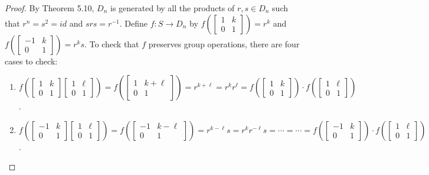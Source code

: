 \documentclass{article}
\theoremstyle{definition}
\newcommand{\inv}[1]{#1^{-1}}
\begin{document}
\begin{proof}
		By Theorem 5.10, $D_n$ is generated by all the products of $r,s\in D_n$ such that $r^n = s^2 = id$ and $srs = \inv{r}$. Define $f: S\to D_n$ by $f\left( \left[ \begin{smallmatrix} 1&k\\0&1\end{smallmatrix} \right] \right) = r^k$ and $f\left( \left[ \begin{smallmatrix} -1&k\\0&1\end{smallmatrix} \right] \right) = r^{k}s$. To check that $f$ preserves group operations, there are four cases to check:
		\begin{enumerate}
			\item $f\left( \left[ \begin{smallmatrix} 1 & k \\ 0 & 1 \end{smallmatrix}  \right] \left[ \begin{smallmatrix} 1 & \ell \\ 0 & 1 \end{smallmatrix}  \right] \right) = f\left(\left[ \begin{smallmatrix} 1 & k+\ell \\ 0 & 1 \end{smallmatrix}  \right]\right) = r^{k+\ell} = r^k r^{\ell} = f\left( \left[ \begin{smallmatrix} 1 & k \\ 0 & 1 \end{smallmatrix}  \right]\right) \cdot f\left( \left[ \begin{smallmatrix} 1 & \ell \\ 0 & 1 \end{smallmatrix}  \right]\right)$. \checkmark
			
			\item $f\left( \left[ \begin{smallmatrix} -1 & k \\ 0 & 1 \end{smallmatrix}  \right] \left[ \begin{smallmatrix} 1 & \ell \\ 0 & 1 \end{smallmatrix}  \right] \right) = f\left(\left[ \begin{smallmatrix} -1 & k-\ell \\ 0 & 1 \end{smallmatrix}  \right]\right) = r^{k-\ell}s = r^k r^{-\ell}s = \cdots = \cdots = f\left( \left[ \begin{smallmatrix} -1 & k \\ 0 & 1 \end{smallmatrix}  \right]\right) \cdot f\left( \left[ \begin{smallmatrix} 1 & \ell \\ 0 & 1 \end{smallmatrix}  \right]\right)$. \checkmark
			

\end{enumerate}
\end{proof}
\end{document}
